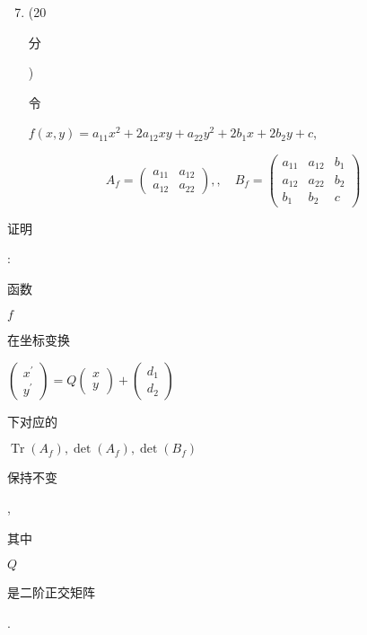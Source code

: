 \documentclass[10pt]{article}
\begin{document}
\begin{enumerate}
  \setcounter{enumi}{6}
  \item (20 \begin{CJK}{UTF8}{mj}分\end{CJK}) \begin{CJK}{UTF8}{mj}令\end{CJK} $f(x, y)=a_{11} x^{2}+2 a_{12} x y+a_{22} y^{2}+2 b_{1} x+2 b_{2} y+c$,
\end{enumerate}
$$
A_{f}=\left(\begin{array}{ll}
a_{11} & a_{12} \\
a_{12} & a_{22}
\end{array}\right),, \quad B_{f}=\left(\begin{array}{lll}
a_{11} & a_{12} & b_{1} \\
a_{12} & a_{22} & b_{2} \\
b_{1} & b_{2} & c
\end{array}\right)
$$
\begin{CJK}{UTF8}{mj}证明\end{CJK}: \begin{CJK}{UTF8}{mj}函数\end{CJK} $f$ \begin{CJK}{UTF8}{mj}在坐标变换\end{CJK} $\left(\begin{array}{c}x^{\prime} \\ y^{\prime}\end{array}\right)=Q\left(\begin{array}{c}x \\ y\end{array}\right)+\left(\begin{array}{c}d_{1} \\ d_{2}\end{array}\right)$ \begin{CJK}{UTF8}{mj}下对应的\end{CJK} $\operatorname{Tr}\left(A_{f}\right), \operatorname{det}\left(A_{f}\right), \operatorname{det}\left(B_{f}\right)$ \begin{CJK}{UTF8}{mj}保持不变\end{CJK}, \begin{CJK}{UTF8}{mj}其中\end{CJK} $Q$ \begin{CJK}{UTF8}{mj}是二阶正交矩阵\end{CJK}.
\end{document}
